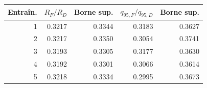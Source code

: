\begin{tabular}{rrrrr}
\toprule Entraîn. & $R_F/R_D$ & Borne sup. & $q_{95,F}/q_{95,D}$ & Borne sup.\\\midrule
1 & 0.3217 & 0.3344 & 0.3183 & 0.3627\\
2 & 0.3217 & 0.3350 & 0.3054 & 0.3741\\
3 & 0.3193 & 0.3305 & 0.3177 & 0.3630\\
4 & 0.3192 & 0.3301 & 0.3066 & 0.3614\\
5 & 0.3218 & 0.3334 & 0.2995 & 0.3673\\
\bottomrule
\end{tabular}
